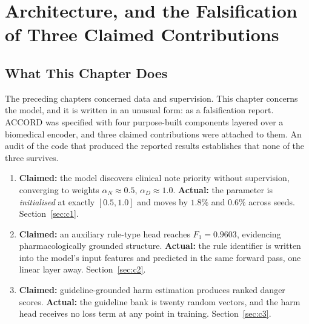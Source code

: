 %
%

\chapter{Architecture, and the Falsification of Three Claimed Contributions}
\label{ch:arch}

\section{What This Chapter Does}
\label{sec:arch-overview}

The preceding chapters concerned data and supervision. This chapter concerns the
model, and it is written in an unusual form: as a falsification report. ACCORD
was specified with four purpose-built components layered over a biomedical
encoder, and three claimed contributions were attached to them. An audit of the
code that produced the reported results establishes that none of the three
survives.

\begin{enumerate}
\item \textbf{Claimed:} the model discovers clinical note priority without
      supervision, converging to weights $\alpha_N \approx 0.5$,
      $\alpha_D \approx 1.0$. \textbf{Actual:} the parameter is
      \emph{initialised} at exactly $[0.5, 1.0]$ and moves by $1.8\%$ and
      $0.6\%$ across seeds. Section~\ref{sec:c1}.
\item \textbf{Claimed:} an auxiliary rule-type head reaches $F_1 = 0.9603$,
      evidencing pharmacologically grounded structure. \textbf{Actual:} the rule
      identifier is written into the model's input features and predicted in the
      same forward pass, one linear layer away. Section~\ref{sec:c2}.
\item \textbf{Claimed:} guideline-grounded harm estimation produces ranked
      danger scores. \textbf{Actual:} the guideline bank is twenty random
      vectors, and the harm head receives no loss term at any point in training.
      Section~\ref{sec:c3}.
\end{enumerate}


